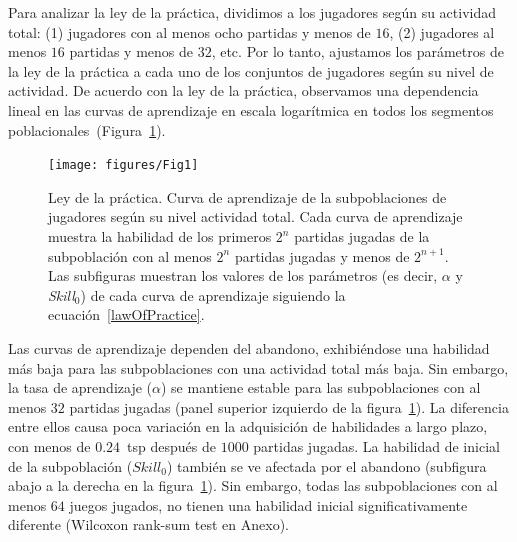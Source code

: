 \documentclass[a4paper,11pt]{book}
\theoremstyle{definition}
\begin{document}

Para analizar la ley de la pr\'actica, dividimos a los jugadores seg\'un su actividad total: (1) jugadores con al menos ocho partidas y menos de $16$, (2) jugadores al menos $16$ partidas y menos de $32$, etc.
%
Por lo tanto, ajustamos los par\'ametros de la ley de la pr\'actica a cada uno de los conjuntos de jugadores seg\'un su nivel de actividad.
%
De acuerdo con la ley de la pr\'actica, observamos una dependencia lineal en las curvas de aprendizaje en escala logar\'itmica en todos los segmentos poblacionales~(Figura~\ref{learningskill_curve}).

\begin{figure}[ht!]
\centering
\texttt{[image: figures/Fig1]}
\caption{Ley de la pr\'actica.
%
Curva de aprendizaje de la subpoblaciones de jugadores seg\'un su nivel actividad total.
%
Cada curva de aprendizaje muestra la habilidad de los primeros $2^n$ partidas jugadas de la subpoblaci\'on con al menos $2^n$ partidas jugadas y menos de $2^{n+1}$.
%
Las subfiguras muestran los valores de los par\'ametros (es decir, $\alpha$ y \emph{Skill}$_0$) de cada curva de aprendizaje siguiendo la ecuaci\'on~\eqref{lawOfPractice}.
}
\label{learningskill_curve}
\end{figure}

Las curvas de aprendizaje dependen del abandono, exhibi\'endose una habilidad m\'as baja para las subpoblaciones con una actividad total m\'as baja.
%
Sin embargo, la tasa de aprendizaje ($\alpha$) se mantiene estable para las subpoblaciones con al menos $32$ partidas jugadas (panel superior izquierdo de la figura~\ref{learningskill_curve}).
%
La diferencia entre ellos causa poca variaci\'on en la adquisici\'on de habilidades a largo plazo, con menos de $0.24$~tsp despu\'es de $1000$ partidas jugadas.
%
La habilidad de inicial de la subpoblaci\'on ($Skill_0$) tambi\'en se ve afectada por el abandono (subfigura abajo a la derecha en la figura~\ref{learningskill_curve}).
%
Sin embargo, todas las subpoblaciones con al menos $64$ juegos jugados, no tienen una habilidad inicial significativamente diferente (Wilcoxon rank-sum test en Anexo).

\end{document}

